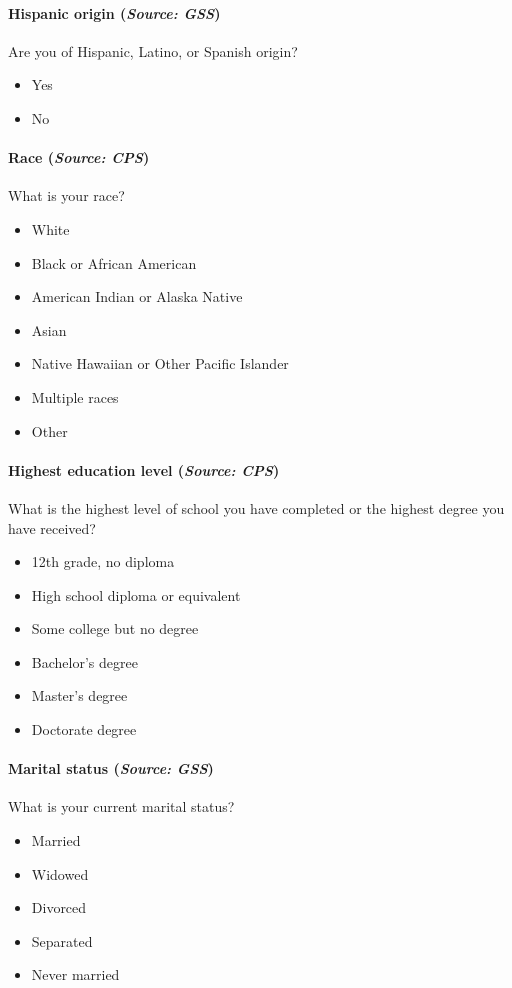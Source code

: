 \paragraph{Hispanic origin (\textit{Source: GSS})}
Are you of Hispanic, Latino, or Spanish origin?
\begin{itemize}[itemsep=-10pt,topsep=0pt]
\item Yes
\item No
\end{itemize}

\paragraph{Race (\textit{Source: CPS})}
What is your race?
\begin{itemize}[itemsep=-10pt,topsep=0pt]
\item White
\item Black or African American
\item American Indian or Alaska Native
\item Asian
\item Native Hawaiian or Other Pacific Islander
\item Multiple races
\item Other
\end{itemize}

\paragraph{Highest education level (\textit{Source: CPS})}
What is the highest level of school you have completed or the highest degree you have received?
\begin{itemize}[itemsep=-10pt,topsep=0pt]
\item 12th grade, no diploma
\item High school diploma or equivalent
\item Some college but no degree
\item Bachelor’s degree
\item Master’s degree
\item Doctorate degree
\end{itemize}

\paragraph{Marital status (\textit{Source: GSS})}
What is your current marital status?
\begin{itemize}[itemsep=-10pt,topsep=0pt]
\item Married
\item Widowed
\item Divorced
\item Separated
\item Never married
\end{itemize}

